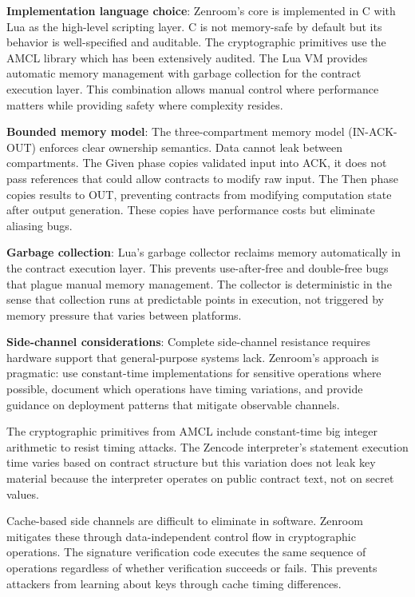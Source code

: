 \textbf{Implementation language choice}: Zenroom's core is implemented
in C with Lua as the high-level scripting layer. C is not memory-safe
by default but its behavior is well-specified and auditable. The
cryptographic primitives use the AMCL library which has been
extensively audited. The Lua VM provides automatic memory management
with garbage collection for the contract execution layer. This
combination allows manual control where performance matters while
providing safety where complexity resides.

\textbf{Bounded memory model}: The three-compartment memory model
(IN-ACK-OUT) enforces clear ownership semantics. Data cannot leak
between compartments. The Given phase copies validated input into ACK,
it does not pass references that could allow contracts to modify raw
input. The Then phase copies results to OUT, preventing contracts from
modifying computation state after output generation. These copies have
performance costs but eliminate aliasing bugs.

\textbf{Garbage collection}: Lua's garbage collector reclaims memory
automatically in the contract execution layer. This prevents
use-after-free and double-free bugs that plague manual memory
management. The collector is deterministic in the sense that
collection runs at predictable points in execution, not triggered by
memory pressure that varies between platforms.

\textbf{Side-channel considerations}: Complete side-channel resistance
requires hardware support that general-purpose systems lack. Zenroom's
approach is pragmatic: use constant-time implementations for sensitive
operations where possible, document which operations have timing
variations, and provide guidance on deployment patterns that mitigate
observable channels.

The cryptographic primitives from AMCL include constant-time big
integer arithmetic to resist timing attacks. The Zencode interpreter's
statement execution time varies based on contract structure but this
variation does not leak key material because the interpreter operates
on public contract text, not on secret values.

Cache-based side channels are difficult to eliminate in
software. Zenroom mitigates these through data-independent control
flow in cryptographic operations. The signature verification code
executes the same sequence of operations regardless of whether
verification succeeds or fails. This prevents attackers from learning
about keys through cache timing differences.


